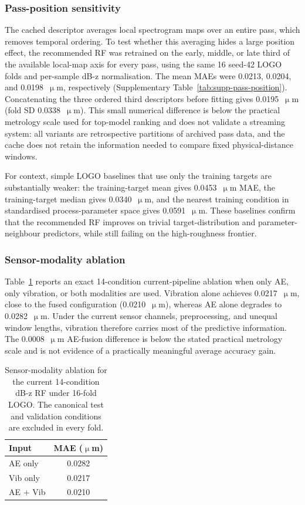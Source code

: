 \subsubsection{Pass-position sensitivity}

The cached descriptor averages local spectrogram maps over an entire pass,
which removes temporal ordering. To test whether this averaging hides a
large position effect, the recommended RF was retrained on the early,
middle, or late third of the available local-map axis for every pass,
using the same 16 seed-42 LOGO folds and per-sample dB-z normalisation.
The mean MAEs were 0.0213, 0.0204, and 0.0198~\(\upmu\)m, respectively
(Supplementary Table~\ref{tab:supp-pass-position}). Concatenating the three
ordered third descriptors before fitting gives 0.0195~\(\upmu\)m
(fold SD 0.0338~\(\upmu\)m). This small numerical difference is below the
practical metrology scale used for top-model ranking and does not validate a
streaming system: all variants are retrospective partitions of archived pass
data, and the cache does not retain the information needed to compare fixed
physical-distance windows.

For context, simple LOGO baselines that use only the training targets are
substantially weaker: the training-target mean gives 0.0453~\(\upmu\)m MAE,
the training-target median gives 0.0340~\(\upmu\)m, and the nearest
training condition in standardised process-parameter space gives
0.0591~\(\upmu\)m. These baselines confirm that the recommended RF improves
on trivial target-distribution and parameter-neighbour predictors, while
still failing on the high-roughness frontier.

\subsubsection{Sensor-modality ablation}

Table~\ref{tab:modality-ablation} reports an exact 14-condition current-pipeline
ablation when only AE, only vibration, or both modalities are used. Vibration
alone achieves 0.0217~\(\upmu\)m, close to the fused configuration
(0.0210~\(\upmu\)m), whereas AE alone degrades to 0.0282~\(\upmu\)m. Under
the current sensor channels, preprocessing, and unequal window lengths,
vibration therefore carries most of the predictive information. The
0.0008~\(\upmu\)m AE-fusion difference is below the stated practical
metrology scale and is not evidence of a practically meaningful average
accuracy gain.

\begin{table}[htbp]
\centering
\caption{Sensor-modality ablation for the current 14-condition dB-z RF under
16-fold LOGO. The canonical test and validation conditions are excluded in
every fold.}\label{tab:modality-ablation}
\begin{tabular}{@{}lc@{}}
\toprule
Input & MAE (\(\upmu\)m) \\
\midrule
AE only & 0.0282 \\
Vib only & 0.0217 \\
AE + Vib & 0.0210 \\
\bottomrule
\end{tabular}
\end{table}

